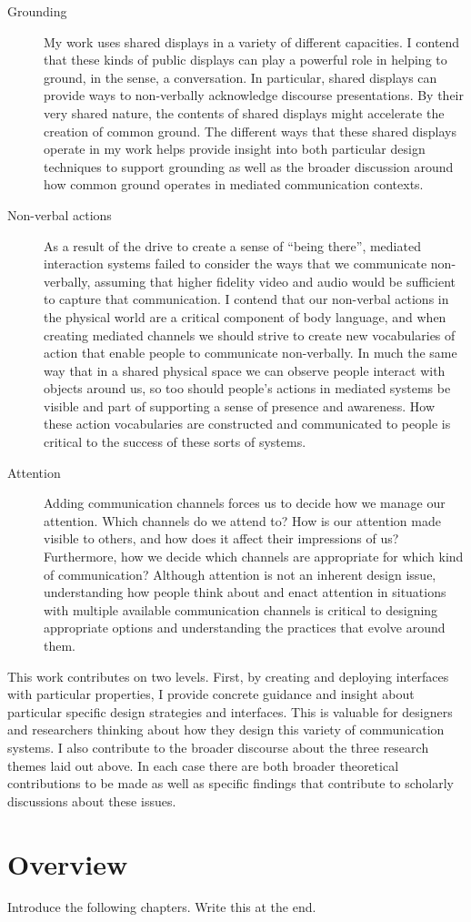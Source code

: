 \begin{description}
	\item[Grounding]{My work uses shared displays in a variety of different capacities. I contend that these kinds of public displays can play a powerful role in helping to ground, in the \citet{Clark:1989uc} sense, a conversation. In particular, shared displays can provide ways to non-verbally acknowledge discourse presentations. By their very shared nature, the contents of shared displays might accelerate the creation of common ground. The different ways that these shared displays operate in my work helps provide insight into both particular design techniques to support grounding as well as the broader discussion around how common ground operates in mediated communication contexts.}
	\item[Non-verbal actions]{As a result of the drive to create a sense of ``being there'', mediated interaction systems failed to consider the ways that we communicate non-verbally, assuming that higher fidelity video and audio would be sufficient to capture that communication. I contend that our non-verbal actions in the physical world are a critical component of body language, and when creating mediated channels we should strive to create new vocabularies of action that enable people to communicate non-verbally. In much the same way that in a shared physical space we can observe people interact with objects around us, so too should people's actions in mediated systems be visible and part of supporting a sense of presence and awareness. How these action vocabularies are constructed and communicated to people is critical to the success of these sorts of systems.}
	\item[Attention]{Adding communication channels forces us to decide how we manage our attention. Which channels do we attend to? How is our attention made visible to others, and how does it affect their impressions of us? Furthermore, how we decide which channels are appropriate for which kind of communication? Although attention is not an inherent design issue, understanding how people think about and enact attention in situations with multiple available communication channels is critical to designing appropriate options and understanding the practices that evolve around them.}
\end{description}

This work contributes on two levels. First, by creating and deploying interfaces with particular properties, I provide concrete guidance and insight about particular specific design strategies and interfaces. This is valuable for designers and researchers thinking about how they design this variety of communication systems. I also contribute to the broader discourse about the three research themes laid out above. In each case there are both broader theoretical contributions to be made as well as specific findings that contribute to scholarly discussions about these issues.


\section{Overview}
Introduce the following chapters. Write this at the end.